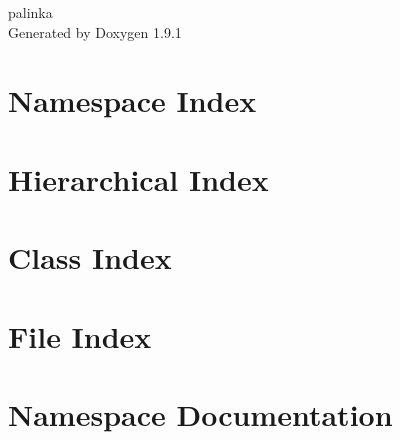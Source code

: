 \let\mypdfximage\pdfximage\def\pdfximage{\immediate\mypdfximage}\documentclass[twoside]{book}
\newcommand{\+}{\discretionary{\mbox{\scriptsize$\hookleftarrow$}}{}{}}
\newcommand{\clearemptydoublepage}{%
  \newpage{\pagestyle{empty}\cleardoublepage}%
}
\begin{document}
\raggedbottom

\hypersetup{pageanchor=false,
             bookmarksnumbered=true,
             pdfencoding=unicode
            }
\begin{titlepage}
\vspace*{7cm}
\begin{center}%
{\Large palinka }\\
\vspace*{1cm}
{\large Generated by Doxygen 1.9.1}\\
\end{center}
\end{titlepage}
\clearemptydoublepage
{}
\tableofcontents
\clearemptydoublepage
{}
\hypersetup{pageanchor=true}

\chapter{Namespace Index}

\chapter{Hierarchical Index}

\chapter{Class Index}

\chapter{File Index}

\chapter{Namespace Documentation}

















\end{document}
